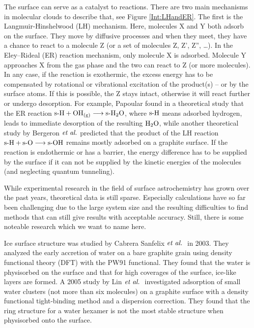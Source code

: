 The surface can serve as a catalyst to reactions. There are two main mechanisms
in molecular clouds to describe that, see Figure \ref{Int:LHandER}. The first
is the Langmuir-Hinshelwood (LH) mechanism.\cite{LangmuirHinshelwood} Here, molecules X and Y both adsorb on the surface. They move by diffusive processes and when they meet, they have a
chance to react to a molecule Z (or a set of molecules Z, Z', Z'', \ldots).
In the Eley--Rideal (ER) reaction mechanism, only molecule X
is adsorbed.\cite{Laidler1996}
Molecule Y approaches X from the gas phase and the two can react to Z (or more
molecules). In any case, if the reaction is exothermic, the excess energy has
to be compensated by rotational or vibrational excitation of the product(s) --
or by the surface atoms.
If this is possible, the Z stays intact, otherwise it will react further or
undergo desorption. For example, Papoular found in a
theoretical study that the ER reaction $\text{s-}{\text H}+{\text O \text H}_\text{(g)}\longrightarrow\text{s-}{\ensuremath{\text H _2 \text O}}$,
where $\text{s-}{\text H}$ means adsorbed hydrogen, leads to immediate desorption of
the resulting $\text H _2 \text O$,\cite{Papoular2005} while another theoretical study by Bergeron $\emph{et al.}$ predicted that the product of the LH reaction 
$\text{s-}{\text H}+\text{s-}{\text O}\longrightarrow\text{s-}{\ensuremath{\text O \text H}}$ remains mostly adsorbed on a graphite
surface.\cite{BergeronRougeauSidisEtAl2008}
If the reaction is endothermic or has a barrier, the energy difference has to
be supplied by the surface if it can not be supplied by the kinetic energies of
the molecules (and neglecting quantum tunneling).

While experimental research in the field of surface astrochemistry has grown
over the past years, theoretical data is still sparse. Especially 
calculations have so far been challenging due to the large system size and the
resulting difficulties to find methods that can still give results with
acceptable accuracy. Still, there is some noteable research which we want to
name here.

Ice surface structure was studied by Cabrera Sanfelix $\emph{et al.}~$ 
in 2003.\cite{CabreraSanfelix2003} They analyzed the early accretion of water
on a bare graphite grain using density functional theory (DFT) with the PW91
functional.\cite{PerdewWang1986,PerdewWang1992} They found that the water is
physisorbed on the surface and that for high coverages of the surface, ice-like
layers are formed. A 2005 study by Lin $\emph{et al.}~$
investigated adsorption of small water clusters (not more than six molecules)
on a graphite surface with a density functional tight-binding method and a
dispersion correction. They found that the ring structure for a water hexamer
is not the most stable structure when physisorbed onto the
surface.\cite{LinZhangLeeEtAl2005}

